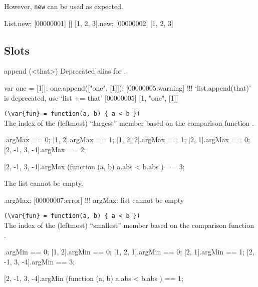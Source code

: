 However, \lstinline|new| can be used as expected.

\begin{urbiscript}
List.new;
[00000001] []
[1, 2, 3].new;
[00000002] [1, 2, 3]
\end{urbiscript}

\subsection{Slots}

\begin{urbiscriptapi}
\item[append](<that>)%
  Deprecated alias for .

\begin{urbiscript}
var one = [1]|;
one.append(["one", [1]]);
[00000005:warning] !!! `list.append(that)' is deprecated, use `list += that'
[00000005] [1, "one", [1]]
\end{urbiscript}


\item {}\lstinline|(\var{fun} = function(a, b) { a < b })|\\%
  The index of the (leftmost) ``largest'' member based on the comparison
  function .
\begin{urbiassert}
           [1].argMax == 0;
        [1, 2].argMax == 1;
     [1, 2, 2].argMax == 1;
        [2, 1].argMax == 0;
[2, -1, 3, -4].argMax == 2;

[2, -1, 3, -4].argMax (function (a, b) { a.abs < b.abs }) == 3;
\end{urbiassert}

The list cannot be empty.

\begin{urbiscript}
[].argMax;
[00000007:error] !!! argMax: list cannot be empty
\end{urbiscript}


\item {}\lstinline|(\var{fun} = function(a, b) { a < b })|\\%
  The index of the (leftmost) ``smallest'' member based on the comparison
  function .
\begin{urbiassert}
           [1].argMin == 0;
        [1, 2].argMin == 0;
     [1, 2, 1].argMin == 0;
        [2, 1].argMin == 1;
[2, -1, 3, -4].argMin == 3;

[2, -1, 3, -4].argMin (function (a, b) { a.abs < b.abs }) == 1;
\end{urbiassert}


\end{urbiscriptapi}
